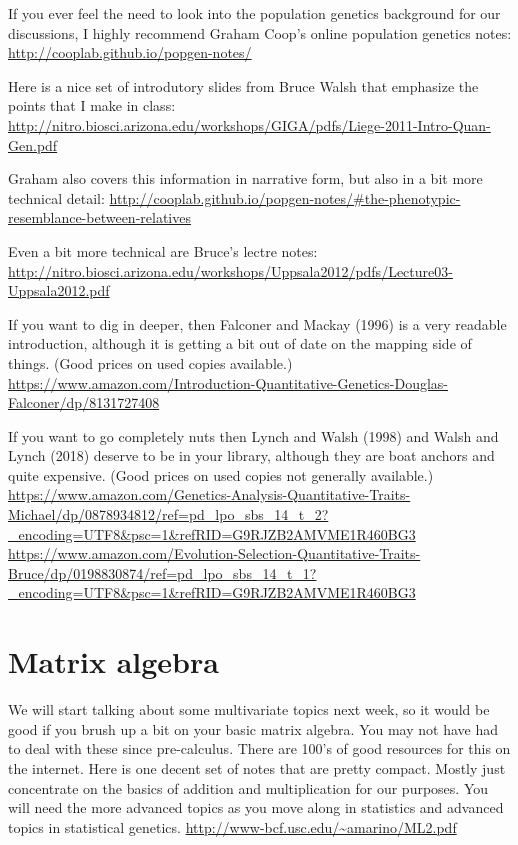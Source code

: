 \documentclass[
]{book}
\begin{document}
If you ever feel the need to look into the population genetics background for our discussions, I highly recommend Graham Coop's online population genetics notes:
\url{http://cooplab.github.io/popgen-notes/}

Here is a nice set of introdutory slides from Bruce Walsh that emphasize the points that I make in class:
\url{http://nitro.biosci.arizona.edu/workshops/GIGA/pdfs/Liege-2011-Intro-Quan-Gen.pdf}

Graham also covers this information in narrative form, but also in a bit more technical detail:
\url{http://cooplab.github.io/popgen-notes/\#the-phenotypic-resemblance-between-relatives}

Even a bit more technical are Bruce's lectre notes:
\url{http://nitro.biosci.arizona.edu/workshops/Uppsala2012/pdfs/Lecture03-Uppsala2012.pdf}

If you want to dig in deeper, then Falconer and Mackay (1996) is a very readable introduction, although it is getting a bit out of date on the mapping side of things. (Good prices on used copies available.)
\url{https://www.amazon.com/Introduction-Quantitative-Genetics-Douglas-Falconer/dp/8131727408}

If you want to go completely nuts then Lynch and Walsh (1998) and Walsh and Lynch (2018) deserve to be in your library, although they are boat anchors and quite expensive. (Good prices on used copies not generally available.)
\url{https://www.amazon.com/Genetics-Analysis-Quantitative-Traits-Michael/dp/0878934812/ref=pd_lpo_sbs_14_t_2?_encoding=UTF8\&psc=1\&refRID=G9RJZB2AMVME1R460BG3}
\url{https://www.amazon.com/Evolution-Selection-Quantitative-Traits-Bruce/dp/0198830874/ref=pd_lpo_sbs_14_t_1?_encoding=UTF8\&psc=1\&refRID=G9RJZB2AMVME1R460BG3}

\hypertarget{matrix-algebra-1}{%
\section{Matrix algebra}\label{matrix-algebra-1}}

We will start talking about some multivariate topics next week, so it would be good if you brush up a bit on your basic matrix algebra. You may not have had to deal with these since pre-calculus. There are 100's of good resources for this on the internet. Here is one decent set of notes that are pretty compact. Mostly just concentrate on the basics of addition and multiplication for our purposes. You will need the more advanced topics as you move along in statistics and advanced topics in statistical genetics.
\url{http://www-bcf.usc.edu/~amarino/ML2.pdf}
\end{document}
